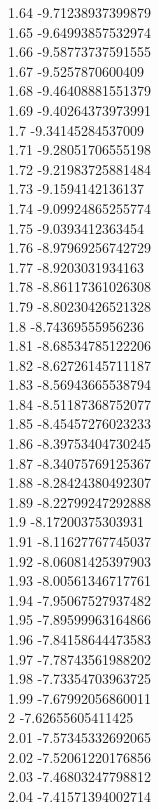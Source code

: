 {1.64	-9.71238937399879\\
1.65	-9.64993857532974\\
1.66	-9.58773737591555\\
1.67	-9.5257870600409\\
1.68	-9.46408881551379\\
1.69	-9.40264373973991\\
1.7	-9.34145284537009\\
1.71	-9.28051706555198\\
1.72	-9.21983725881484\\
1.73	-9.1594142136137\\
1.74	-9.09924865255774\\
1.75	-9.0393412363454\\
1.76	-8.97969256742729\\
1.77	-8.9203031934163\\
1.78	-8.86117361026308\\
1.79	-8.80230426521328\\
1.8	-8.74369555956236\\
1.81	-8.68534785122206\\
1.82	-8.62726145711187\\
1.83	-8.56943665538794\\
1.84	-8.51187368752077\\
1.85	-8.45457276023233\\
1.86	-8.39753404730245\\
1.87	-8.34075769125367\\
1.88	-8.28424380492307\\
1.89	-8.22799247292888\\
1.9	-8.17200375303931\\
1.91	-8.11627767745037\\
1.92	-8.06081425397903\\
1.93	-8.00561346717761\\
1.94	-7.95067527937482\\
1.95	-7.89599963164866\\
1.96	-7.84158644473583\\
1.97	-7.78743561988202\\
1.98	-7.73354703963725\\
1.99	-7.67992056860011\\
2	-7.62655605411425\\
2.01	-7.57345332692065\\
2.02	-7.52061220176856\\
2.03	-7.46803247798812\\
2.04	-7.41571394002714\\
}
